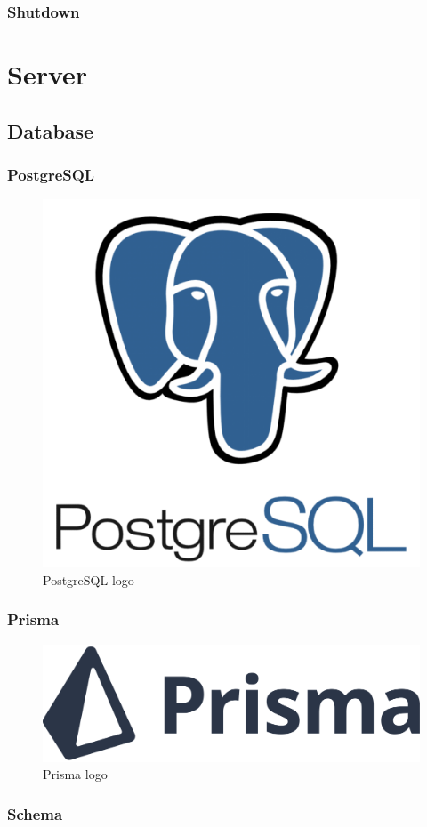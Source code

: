 \subsubsection{Shutdown}
\label{subsubsec:implementation_installer_services_shutdown}

\section{Server}
\label{sec:implementation_server}

\subsection{Database}
\label{subsec:implementation_server_database}

\subsubsection{PostgreSQL}
\label{subsubsec:implementation_server_database_postgresql}

\begin{figure}
  \centering
  \includegraphics[width=.25\textwidth]{images/logos/postgresql.png}
  \caption{PostgreSQL logo}
\end{figure}

\subsubsection{Prisma}
\label{subsubsec:implementation_server_database_prisma}

\begin{figure}
  \centering
  \includegraphics[width=.25\textwidth]{images/logos/prisma.png}
  \caption{Prisma logo}
\end{figure}

\subsubsection{Schema}
\label{subsubsec:implementation_server_database_schema}

